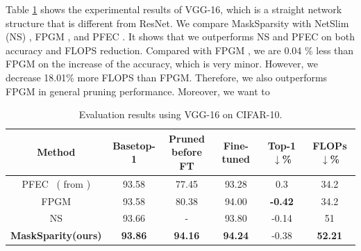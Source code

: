\documentclass[review]{cvpr}
\begin{document}
Table \ref{exp-table-cifar10-VGG16} shows the experimental results of VGG-16, which is a straight network structure that is different from ResNet. We compare MaskSparsity with NetSlim (NS) \cite{liu2017learning}, FPGM \cite{FPGM}, and PFEC \cite{li2016pruning}. It shows that we outperforms NS \cite{liu2017learning} and PFEC \cite{li2016pruning} on both accuracy and FLOPS reduction. Compared with FPGM \cite{FPGM}, we are 0.04 \% less than FPGM on the increase of the accuracy, which is very minor. However, we decrease 18.01\% more FLOPS than FPGM. Therefore, we also outperforms FPGM in general pruning performance. Moreover, we want to 


\begin{table}[ht]
	\caption{Evaluation results using VGG-16 on CIFAR-10.}
	\vspace{+0.2em}
	\scriptsize
	\setlength{\tabcolsep}{0.35em}
	\begin{center}
		\begin{tabular}{cccccc}
			\hline
			
		Method 			&Basetop-1		&\shortstack {Pruned\\before FT} &Fine-tuned	& Top-1 $\downarrow$\% 	&FLOPs$\downarrow$\% \\ 
		\hline
		
		PFEC~\cite{li2016pruning} {\scriptsize{( from \cite{FPGM})}}   & 93.58  &77.45 & 93.28 & 0.3  &34.2\\  
		
		FPGM \cite{FPGM}   & 93.58  &80.38 & 94.00  &\textbf{-0.42} &34.2\\  
		
		NS \cite{liu2017learning} & 93.66 &-  & 93.80  &-0.14 &51\\  
		
    	\textbf{MaskSparity(ours)}                &\textbf{93.86}   &\textbf{94.16} &\textbf{94.24} &-0.38 & \textbf{52.21}\\ 
			
		
		    
			\hline
		
		\end{tabular}
	\end{center}
	\label{exp-table-cifar10-VGG16}
\end{table}
\end{document}
